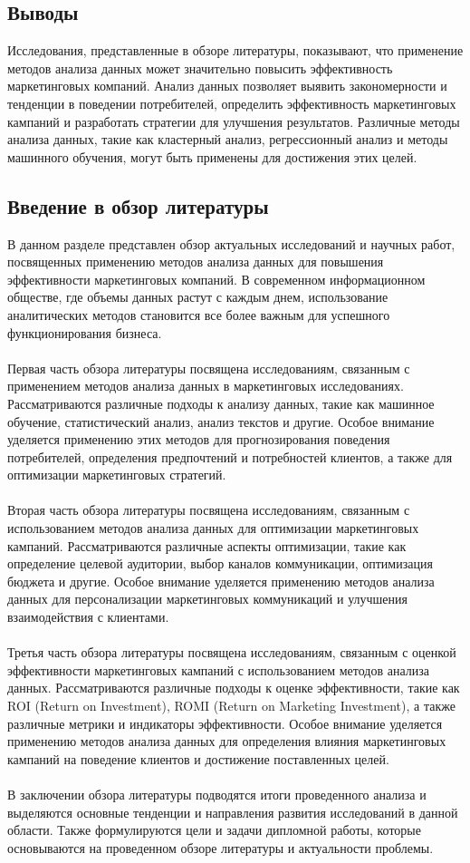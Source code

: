 \documentclass{article}
\begin{document}
\subsection{Выводы}
Исследования, представленные в обзоре литературы, показывают, что применение методов анализа данных может значительно повысить эффективность маркетинговых компаний. Анализ данных позволяет выявить закономерности и тенденции в поведении потребителей, определить эффективность маркетинговых кампаний и разработать стратегии для улучшения результатов. Различные методы анализа данных, такие как кластерный анализ, регрессионный анализ и методы машинного обучения, могут быть применены для достижения этих целей.
\subsection{Введение в обзор литературы}
В данном разделе представлен обзор актуальных исследований и научных работ, посвященных применению методов анализа данных для повышения эффективности маркетинговых компаний. В современном информационном обществе, где объемы данных растут с каждым днем, использование аналитических методов становится все более важным для успешного функционирования бизнеса.\\
~\\
Первая часть обзора литературы посвящена исследованиям, связанным с применением методов анализа данных в маркетинговых исследованиях. Рассматриваются различные подходы к анализу данных, такие как машинное обучение, статистический анализ, анализ текстов и другие. Особое внимание уделяется применению этих методов для прогнозирования поведения потребителей, определения предпочтений и потребностей клиентов, а также для оптимизации маркетинговых стратегий.\\
~\\
Вторая часть обзора литературы посвящена исследованиям, связанным с использованием методов анализа данных для оптимизации маркетинговых кампаний. Рассматриваются различные аспекты оптимизации, такие как определение целевой аудитории, выбор каналов коммуникации, оптимизация бюджета и другие. Особое внимание уделяется применению методов анализа данных для персонализации маркетинговых коммуникаций и улучшения взаимодействия с клиентами.\\
~\\
Третья часть обзора литературы посвящена исследованиям, связанным с оценкой эффективности маркетинговых кампаний с использованием методов анализа данных. Рассматриваются различные подходы к оценке эффективности, такие как ROI (Return on Investment), ROMI (Return on Marketing Investment), а также различные метрики и индикаторы эффективности. Особое внимание уделяется применению методов анализа данных для определения влияния маркетинговых кампаний на поведение клиентов и достижение поставленных целей.\\
~\\
В заключении обзора литературы подводятся итоги проведенного анализа и выделяются основные тенденции и направления развития исследований в данной области. Также формулируются цели и задачи дипломной работы, которые основываются на проведенном обзоре литературы и актуальности проблемы.
\end{document}
